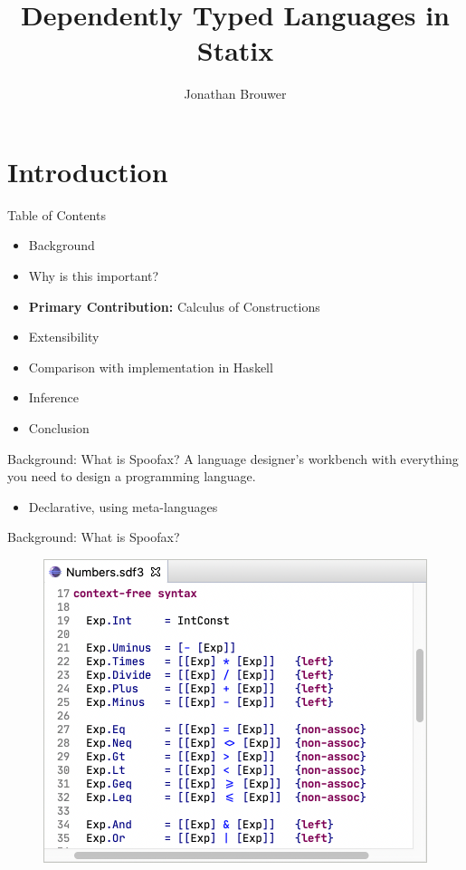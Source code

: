 \documentclass[aspectratio=43]{beamer}
\title[]{Dependently Typed Languages in Statix}
\institute[]{Delft University of Technology, The Netherlands}
\author{Jonathan Brouwer}
\begin{document}
\section{Introduction}
{
\frame{\titlepage}
}

\begin{frame}[fragile]{Table of Contents}
	\begin{itemize}
		\item Background
		\item Why is this important?
		\item \textbf{Primary Contribution:} Calculus of Constructions
		\item Extensibility
		\item Comparison with implementation in Haskell
		\item Inference
		\item Conclusion
	\end{itemize}
\end{frame}

\begin{frame}[fragile]{Background: What is Spoofax?}
	A language designer's workbench with everything you need to design a programming language.
	\begin{itemize}
		\item Declarative, using meta-languages
	\end{itemize}
\end{frame}

\begin{frame}[fragile]{Background: What is Spoofax?}
\begin{figure}
	\includegraphics[width=0.8\linewidth]{img/syntax}
\end{figure}
\end{frame}
\end{document}
